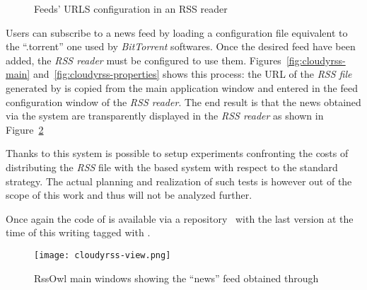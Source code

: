 \begin{figure}[h!]
  \centering
  \caption{Feeds' URLS configuration in an RSS reader}
  \label{fig:cloudyrss-feeds}
\end{figure}

\clearpage
Users can subscribe to a news feed by loading a
configuration file equivalent to the ``.torrent'' one used by
\textit{BitTorrent} softwares. Once the desired feed have been
added, the \textit{RSS reader} must be configured to use them.
Figures~\ref{fig:cloudyrss-main} and~\ref{fig:cloudyrss-properties}
shows this process: the URL of the \textit{RSS file} generated by
\cloudypeer is copied from the main application window and entered in
the feed configuration window of the \textit{RSS reader}.
The end result is that the news obtained via the \cloudcast system are
transparently displayed in the \textit{RSS reader} as shown in
Figure~\ref{fig:cloudyrss-view}

Thanks to this system is possible to setup experiments confronting the
costs of distributing the \textit{RSS} file with the
\cloudcast based system with respect to the standard strategy. The actual
planning and realization of such tests is however out of the scope of
this work and thus will not be analyzed further.

Once again the code of \cloudyrss is available via a \github
repository~\cite{cloudyrss-repo} with the last version at the time of
this writing tagged with \thesistag.

\begin{figure}[h!]
  \hspace{-40pt}
  \texttt{[image: cloudyrss-view.png]}
  \caption{RssOwl main windows showing the ``news'' feed obtained
    through \cloudyrss}
  \label{fig:cloudyrss-view}
\end{figure}
